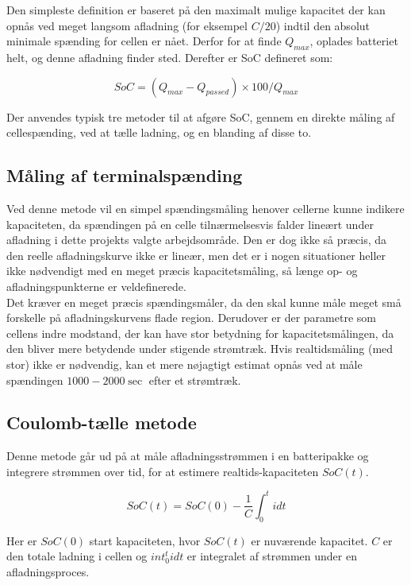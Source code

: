 Den simpleste definition er baseret på den maximalt mulige kapacitet der kan opnås ved meget langsom afladning (for eksempel $C/20$) indtil den absolut minimale spænding for cellen er nået. Derfor for at finde $Q_{max}$, oplades batteriet helt, og denne afladning finder sted. Derefter er SoC defineret som: 

\begin {equation} 
SoC = (Q_{max}-Q_{passed})\times 100/Q_{max} \label{eq:soc}
\end {equation}

Der anvendes typisk tre metoder til at afgøre SoC, gennem en direkte måling af cellespænding, ved at tælle ladning, og en blanding af disse to.

\subsection{Måling af terminalspænding}
Ved denne metode vil en simpel spændingsmåling henover cellerne kunne indikere kapaciteten, da spændingen på en celle tilnærmelsesvis falder lineært under afladning i dette projekts valgte arbejdsområde. Den er dog ikke så præcis, da den reelle afladningskurve ikke er lineær, men det er i nogen situationer heller ikke nødvendigt med en meget præcis kapacitetsmåling, så længe op- og afladningspunkterne er veldefinerede.
\\

Det kræver en meget præcis spændingsmåler, da den skal kunne måle meget små forskelle på afladningskurvens flade region. Derudover er der parametre som cellens indre modstand, der kan have stor betydning for kapacitetsmålingen, da den bliver mere betydende under stigende strømtræk. Hvis realtidsmåling (med stor) ikke er nødvendig, kan et mere nøjagtigt estimat opnås ved at måle spændingen $1000 - 2000 \sec$ efter et strømtræk.


\subsection{Coulomb-tælle metode}
Denne metode går ud på at måle afladningsstrømmen i en batteripakke og integrere strømmen over tid, for at estimere realtids-kapaciteten $SoC(t)$. 

\begin {equation} 
SoC(t) = SoC(0) - \frac{1}{C} \int_{0}^{t} idt  \label{eq:coulomb-count}
\end {equation}

Her er $SoC(0)$ start kapaciteten, hvor $SoC(t)$ er nuværende kapacitet. $C$ er den totale ladning i cellen og $int_{0}^{t} idt$ er integralet af strømmen under en afladningsproces.
\\


